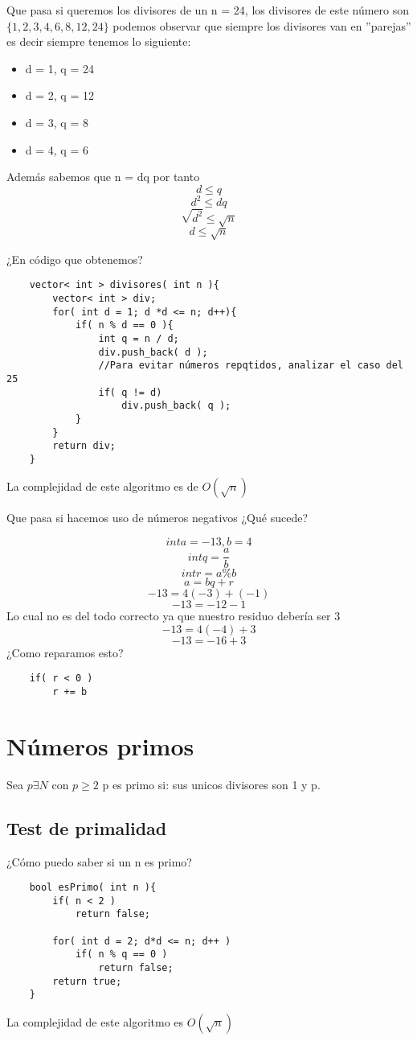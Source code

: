 Que pasa si queremos los divisores de un n = 24, los divisores de este número son $\{1, 2, 3, 4, 6, 8, 12, 24\}$ podemos observar que siempre los divisores van en ''parejas'' es decir siempre tenemos lo siguiente: \newline
\begin{itemize}
    \item {d = 1, q = 24}
    \item {d = 2, q = 12}
    \item {d = 3, q = 8}
    \item {d = 4, q = 6}
\end{itemize}

Además sabemos que n = dq por tanto \newline
\[ d \leq q \]
\[ d^{2} \leq dq \]
\[ \sqrt{d^{2}} \leq \sqrt{n} \]
\[ d \leq \sqrt{n} \]

¿En código que obtenemos?

\begin{lstlisting}
    vector< int > divisores( int n ){
        vector< int > div;
        for( int d = 1; d *d <= n; d++){
            if( n % d == 0 ){
                int q = n / d;
                div.push_back( d );
                //Para evitar números repqtidos, analizar el caso del 25
                if( q != d)
                    div.push_back( q );
            }
        }
        return div;
    }
\end{lstlisting}

La complejidad de este algoritmo es de $O(\sqrt{n})$ \newline

Que pasa si hacemos uso de números negativos ¿Qué sucede?

\[ int a = -13, b = 4\]
\[ int q = \frac{a}{b} \]
\[ int r = a \% b \]
\[ a = bq + r\]
\[ -13 = 4(-3) + (-1)\]
\[ -13 = -12 - 1\]
Lo cual no es del todo correcto ya que nuestro residuo debería ser 3
\[ -13 = 4(-4) + 3\]
\[ -13 = -16 + 3\]
¿Como reparamos esto?
\begin{lstlisting}
    if( r < 0 )
        r += b
\end{lstlisting}

\section{Números primos}

Sea $p \exists N$ con $p \geq 2$ p es primo si: sus unicos divisores son 1 y p.

\subsection{Test de primalidad}
¿Cómo puedo saber si un n es primo?
\begin{lstlisting}
    bool esPrimo( int n ){
        if( n < 2 )
            return false;

        for( int d = 2; d*d <= n; d++ )
            if( n % q == 0 )
                return false;
        return true;
    }
\end{lstlisting}
La complejidad de este algoritmo es $O(\sqrt{n})$

